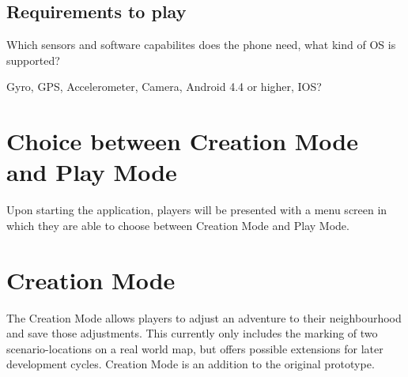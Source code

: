 \documentclass{sigchi-ext}
\begin{document}
\subsection{Requirements to play}

Which sensors and software capabilites does the phone need, what kind of OS is supported?

Gyro, GPS, Accelerometer, Camera, Android 4.4 or higher, IOS? 

\section{Choice between Creation Mode and Play Mode}

Upon starting the application, players will be presented with a menu screen in which they are able to choose between Creation Mode and Play Mode.


\section{Creation Mode} 
\label{sec:Creation}

The Creation Mode allows players to adjust an adventure to their neighbourhood and save those adjustments. This currently only includes the marking of two scenario-locations on a real world map, but offers possible extensions for later development cycles. Creation Mode is an addition to the original prototype.
\end{document}
